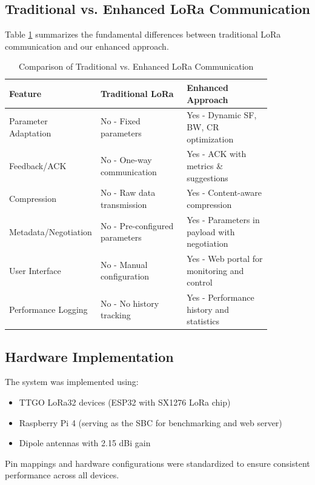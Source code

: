 \documentclass[conference]{IEEEtran}
\begin{document}
\subsection{Traditional vs. Enhanced LoRa Communication}
Table \ref{tab:comparison} summarizes the fundamental differences between traditional LoRa communication and our enhanced approach.

\begin{table}[htbp]
\caption{Comparison of Traditional vs. Enhanced LoRa Communication}
\label{tab:comparison}
\begin{center}
\begin{tabular}{|p{0.18\linewidth}|p{0.34\linewidth}|p{0.34\linewidth}|}
\hline
\textbf{Feature} & \textbf{Traditional LoRa} & \textbf{Enhanced Approach} \\
\hline
Parameter Adaptation & No - Fixed parameters & Yes - Dynamic SF, BW, CR optimization \\
\hline
Feedback/ACK & No - One-way communication & Yes - ACK with metrics \& suggestions \\
\hline
Compression & No - Raw data transmission & Yes - Content-aware compression \\
\hline
Metadata/Negotiation & No - Pre-configured parameters & Yes - Parameters in payload with negotiation \\
\hline
User Interface & No - Manual configuration & Yes - Web portal for monitoring and control \\
\hline
Performance Logging & No - No history tracking & Yes - Performance history and statistics \\
\hline
\end{tabular}
\end{center}
\end{table}

\subsection{Hardware Implementation}
The system was implemented using:
\begin{itemize}
    \item TTGO LoRa32 devices (ESP32 with SX1276 LoRa chip)
    \item Raspberry Pi 4 (serving as the SBC for benchmarking and web server)
    \item Dipole antennas with 2.15 dBi gain
\end{itemize}

Pin mappings and hardware configurations were standardized to ensure consistent performance across all devices.
\end{document}
